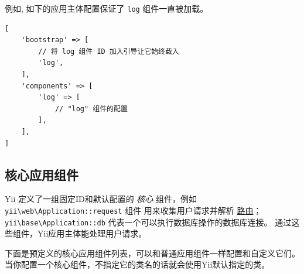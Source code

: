 例如, 如下的应用主体配置保证了 \lstinline|log| 组件一直被加载。

\lstset{language=php}\begin{lstlisting}
[
    'bootstrap' => [
        // 将 log 组件 ID 加入引导让它始终载入
        'log',
    ],
    'components' => [
        'log' => [
            // "log" 组件的配置
        ],
    ],
]
\end{lstlisting}
\subsection{核心应用组件 \label{structure-application-components.md::core-application-components}}
Yii 定义了一组固定ID和默认配置的 \textit{核心} 组件，例如 \texttt{yii{\allowbreak{}\textbackslash}web{\allowbreak{}\textbackslash}Application\allowbreak{}::\allowbreak{}request} 组件
用来收集用户请求并解析 \hyperref[runtime-routing.md]{路由}；
\texttt{yii{\allowbreak{}\textbackslash}base{\allowbreak{}\textbackslash}Application\allowbreak{}::\allowbreak{}db} 代表一个可以执行数据库操作的数据库连接。
通过这些组件，Yii应用主体能处理用户请求。

下面是预定义的核心应用组件列表，可以和普通应用组件一样配置和自定义它们。
当你配置一个核心组件，不指定它的类名的话就会使用Yii默认指定的类。

